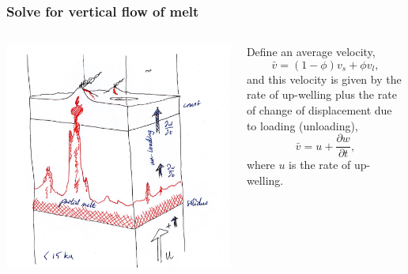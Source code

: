 \documentclass[aspectratio=169]{beamer}
\begin{document}
\begin{frame}
    \frametitle{Solve for vertical flow of melt}
    \begin{columns}
        \begin{column}{0.5\textwidth}
            \includegraphics[width=.45\paperwidth]{./figures/sketch1b.png}
        \end{column}
        \begin{column}{0.5\textwidth}
            Define an average velocity,\newline
            \[
            \bar{v} = (1-\phi)v_{s} + \phi v_{l},
            \]
            and this velocity is given by the rate of up-welling plus the rate of change of displacement due to loading (unloading),\newline
            \[
            \bar{v} = u + \frac{\partial w}{\partial t},
            \]
            where $u$ is the rate of up-welling.
        \end{column}
    \end{columns}
\end{frame}
\end{document}

